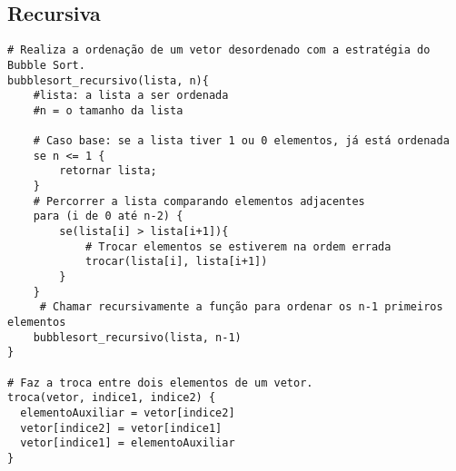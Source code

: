 \subsection{Recursiva}
\begin{verbatim}
# Realiza a ordenação de um vetor desordenado com a estratégia do Bubble Sort.
bubblesort_recursivo(lista, n){
    #lista: a lista a ser ordenada
    #n = o tamanho da lista

    # Caso base: se a lista tiver 1 ou 0 elementos, já está ordenada
    se n <= 1 {
        retornar lista;
    }
    # Percorrer a lista comparando elementos adjacentes
    para (i de 0 até n-2) {
        se(lista[i] > lista[i+1]){
            # Trocar elementos se estiverem na ordem errada
            trocar(lista[i], lista[i+1])
        }
    }
     # Chamar recursivamente a função para ordenar os n-1 primeiros elementos
    bubblesort_recursivo(lista, n-1)
}    

# Faz a troca entre dois elementos de um vetor.
troca(vetor, indice1, indice2) { 
  elementoAuxiliar = vetor[indice2]
  vetor[indice2] = vetor[indice1]
  vetor[indice1] = elementoAuxiliar
}
\end{verbatim}
